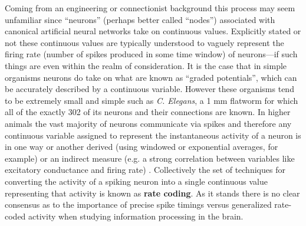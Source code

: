 Coming from an engineering or connectionist background this process may seem unfamiliar since ``neurons'' (perhaps better called ``nodes'') associated with canonical artificial neural networks take on continuous values. Explicitly stated or not these continuous values are typically understood to vaguely represent the firing rate (number of spikes produced in some time window) of neurons---if such things are even within the realm of consideration. It is the case that in simple organisms neurons do take on what are known as  ``graded potentials'', which can be accurately described by a continuous variable. However these organisms tend to be extremely small and simple such as \emph{C. Elegans}, a 1 mm flatworm for which all of the exactly 302 of its neurons and their connections are known. In higher animals the vast majority of neurons communicate via spikes and therefore any continuous variable assigned to represent the instantaneous activity of a neuron is in one way or another derived (using windowed or exponential averages, for example) or an indirect measure (e.g. a strong correlation between variables like excitatory conductance and firing rate) \cite{o2016leabra}. Collectively the set of techniques for converting the activity of a spiking neuron into a single continuous value representing that activity is known as \textbf{rate coding}. As it stands there is no clear consensus as to the importance of precise spike timings versus generalized rate-coded activity when studying information processing in the brain.

